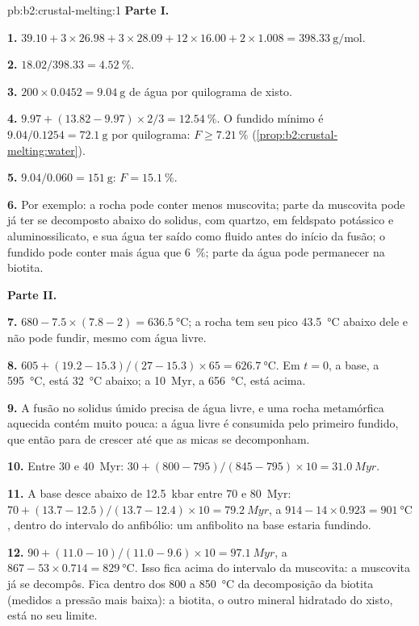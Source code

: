\begin{solution}{pb:b2:crustal-melting:1}
\noindent\textbf{Parte I.}

\textbf{1.} $39.10 + 3\times26.98 + 3\times28.09 + 12\times16.00 + 2\times1.008 =
\qty{398.33}{\gram\per\mole}$.

\textbf{2.} $18.02/398.33 = \qty{4.52}{\percent}$.

\textbf{3.} $200\times0.0452 = \qty{9.04}{\gram}$ de água por quilograma de xisto.

\textbf{4.} $9.97 + (13.82 - 9.97)\times2/3 = \qty{12.54}{\percent}$. O fundido mínimo é
$9.04/0.1254 = \qty{72.1}{\gram}$ por quilograma: $F \ge \qty{7.21}{\percent}$
(\cref{prop:b2:crustal-melting:water}).

\textbf{5.} $9.04/0.060 = \qty{151}{\gram}$: $F = \qty{15.1}{\percent}$.

\textbf{6.} Por exemplo: a rocha pode conter menos muscovita; parte da muscovita pode
já ter se decomposto abaixo do solidus, com quartzo, em feldspato potássico e
aluminossilicato, e sua água ter saído como fluido antes do início da fusão; o fundido pode conter mais
água que \qty{6}{\percent}; parte da água pode permanecer na biotita.

\noindent\textbf{Parte II.}

\textbf{7.} $680 - 7.5\times(7.8 - 2) = \qty{636.5}{\celsius}$; a rocha tem seu pico
\qty{43.5}{\celsius} abaixo dele e não pode fundir, mesmo com água livre.

\textbf{8.} $605 + (19.2 - 15.3)/(27 - 15.3)\times65 = \qty{626.7}{\celsius}$. Em
$t = 0$, a base, a \qty{595}{\celsius}, está \qty{32}{\celsius} abaixo; a
\qty{10}{Myr}, a \qty{656}{\celsius}, está acima.

\textbf{9.} A fusão no solidus úmido precisa de água livre, e uma rocha metamórfica aquecida
contém muito pouca: a água livre é consumida pelo primeiro fundido, que então para de crescer
até que as micas se decomponham.

\textbf{10.} Entre 30 e \qty{40}{Myr}: $30 + (800 - 795)/(845 - 795)\times10 =
\qty{31.0}{Myr}$.

\textbf{11.} A base desce abaixo de \qty{12.5}{kbar} entre 70 e \qty{80}{Myr}:
$70 + (13.7 - 12.5)/(13.7 - 12.4)\times10 = \qty{79.2}{Myr}$, a
$914 - 14\times0.923 = \qty{901}{\celsius}$, dentro do intervalo do anfibólio: um anfibolito
na base estaria fundindo.

\textbf{12.} $90 + (11.0 - 10)/(11.0 - 9.6)\times10 = \qty{97.1}{Myr}$, a $867 -
53\times0.714 = \qty{829}{\celsius}$. Isso fica acima do intervalo da muscovita: a muscovita
já se decompôs. Fica dentro dos 800 a \qty{850}{\celsius} da decomposição da biotita
(medidos a pressão mais baixa): a biotita, o outro mineral hidratado do xisto, está no seu
limite.


\end{solution}
